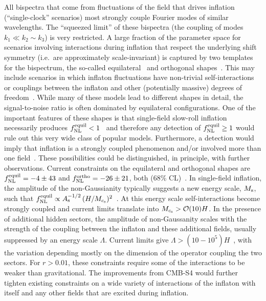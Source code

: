 All bispectra that come from fluctuations of the field that drives inflation (``single-clock'' scenarios) most strongly couple Fourier modes of similar wavelengths. The ``squeezed limit'' of these bispectra (the coupling of modes $k_1\ll k_2\sim k_3$) is very restricted. 
A large fraction of the parameter space for scenarios involving interactions during inflation that respect the underlying shift symmetry (i.e.\ are approximately scale-invariant) is captured by two templates for the bispectrum, the so-called equilateral~\cite{Babich:2004gb} and orthogonal shapes~\cite{Senatore:2009gt}. 
This may include scenarios in which inflaton fluctuations have non-trivial self-interactions~\cite{Silverstein:2003hf,ArkaniHamed:2003uz,Alishahiha:2004eh,Chen:2006nt,Cheung:2007st,Senatore:2009gt} or couplings between the inflaton and other (potentially massive) degrees of freedom~\cite{Chen:2009zp,Tolley:2009fg, Cremonini:2010ua, Achucarro:2010da,Baumann:2011nk,Barnaby:2011pe,Arkani-Hamed:2015bza}.  While many of these models lead to different shapes in detail, the signal-to-noise ratio is often dominated by equilateral configurations.  One of the important features of these shapes is that single-field slow-roll inflation necessarily produces $f_{\rm NL}^{\rm equil} < 1$~\cite{Creminelli:2003iq} and therefore any detection of $f_{\rm NL}^{\rm equil} \geq 1$ would rule out this very wide class of popular models.  Furthermore, a detection would imply that inflation is a strongly coupled phenomenon and/or involved more than one field~\cite{Baumann:2014cja,Alvarez:2014vva,Baumann:2015nta}.  These possibilities could be distinguished, in principle, with further observations.  Current constraints on the equilateral and orthogonal shapes are $f_{\rm NL}^{\rm equil} = -4 \pm 43$ and $f_{\rm NL}^{\rm ortho} = -26 \pm 21$, both (68\% CL)~\cite{Ade:2015ava}. In single-field inflation, the amplitude of the non-Gaussianity typically suggests a new energy scale, $M_{\rm s}$, such that $f_{\rm NL}^{\rm equil} \propto A_{\rm s}^{-1/2} \, (H/M_{c_{\rm s}})^2$~\cite{Cheung:2007st,Baumann:2011su}. At this energy scale self-interactions become strongly coupled and current limits translate into $M_{c_{\rm s}}>\mathcal{O}(10)H$.  In the presence of additional hidden sectors, the amplitude of non-Gaussanity scales with the strength of the coupling between the inflaton and these additional fields, usually suppressed by an energy scale $\Lambda$.  Current limits give $\Lambda  > (10{-}10^{5}) H$~\cite{Green:2013rd,Assassi:2013gxa}, with the variation depending mostly on the dimension of the operator coupling the two sectors.  For $r > 0.01$, these constraints require some of the interactions to be weaker than gravitational.  The improvements from CMB-S4 would further tighten existing constraints on a wide variety of interactions of the inflaton with itself and any other fields that are excited during inflation.    

